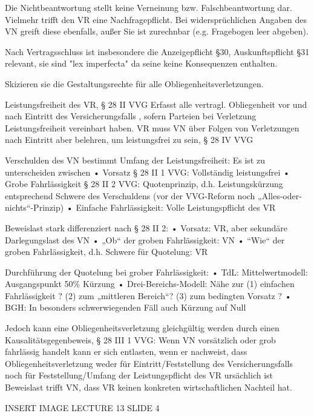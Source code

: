 Die Nichtbeantwortung stellt keine Verneinung bzw. Falschbeantwortung dar. Vielmehr trifft den VR eine Nachfragepflicht.
Bei widersprüchlichen Angaben des VN greift diese ebenfalls, außer Sie ist zurechnbar (e.g. Fragebogen leer abgeben).

Nach Vertragsschluss ist insbesondere die Anzeigepflicht §30, Auskunftspflicht §31 relevant, sie sind "lex imperfecta"
da seine keine Konsequenzen enthalten.


Skizieren sie die Gestaltungsrechte für alle Obliegenheitsverletzungen.

Leistungsfreiheit des VR, § 28 II VVG
Erfasst alle vertragl. Obliegenheit vor und nach Eintritt des
Versicherungsfalls , sofern Parteien bei Verletzung Leistungsfreiheit
vereinbart haben. VR muss VN über Folgen von Verletzungen nach Eintritt
aber belehren, um leistungsfrei zu sein, § 28 IV VVG

Verschulden des VN bestimmt Umfang der Leistungsfreiheit:
Es ist zu unterscheiden zwischen
• Vorsatz § 28 II 1 VVG: Vollständig leistungsfrei
• Grobe Fahrlässigkeit § 28 II 2 VVG: Quotenprinzip, d.h. Leistungskürzung
entsprechend Schwere des Verschuldens (vor der VVG-Reform noch „Alles-oder-
nichts“-Prinzip)
• Einfache Fahrlässigkeit: Volle Leistungspflicht des VR

Beweislast stark differenziert nach § 28 II 2:
• Vorsatz: VR, aber sekundäre Darlegungslast des VN
• „Ob“ der groben Fahrlässigkeit: VN
• “Wie“ der groben Fahrlässigkeit, d.h. Schwere für Quotelung: VR

Durchführung der Quotelung bei grober Fahrlässigkeit:
• TdL: Mittelwertmodell: Ausgangspunkt 50\% Kürzung
• Drei-Bereichs-Modell: Nähe zur (1) einfachen Fahrlässigkeit ? (2) zum
„mittleren Bereich“? (3) zum bedingten Vorsatz ?
• BGH: In besonders schwerwiegenden Fäll auch Kürzung auf Null

Jedoch kann eine Obliegenheitsverletzung gleichgültig werden durch
einen Kausalitätsgegenbeweis, § 28 III 1 VVG:
Wenn VN vorsätzlich oder grob fahrlässig handelt kann er sich
entlasten, wenn er nachweist, dass Obliegenheitsverletzung weder
für Eintritt/Feststellung des Versicherungsfalls noch für
Feststellung/Umfang der Leistungspflicht des VR ursächlich ist
Beweislast trifft VN, dass VR keinen konkreten wirtschaftlichen
Nachteil hat.

INSERT IMAGE LECTURE 13 SLIDE 4

